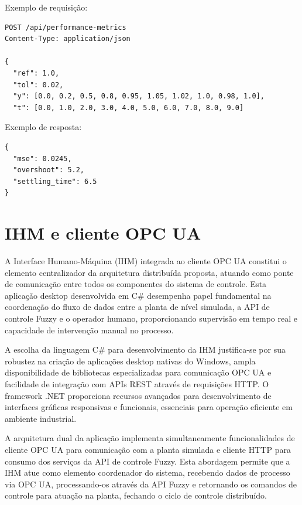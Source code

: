 Exemplo de requisição:

\begin{verbatim}
POST /api/performance-metrics
Content-Type: application/json

{
  "ref": 1.0,
  "tol": 0.02,
  "y": [0.0, 0.2, 0.5, 0.8, 0.95, 1.05, 1.02, 1.0, 0.98, 1.0],
  "t": [0.0, 1.0, 2.0, 3.0, 4.0, 5.0, 6.0, 7.0, 8.0, 9.0]

\end{verbatim}

Exemplo de resposta:

\begin{center}
\begin{verbatim}
{
  "mse": 0.0245,
  "overshoot": 5.2,
  "settling_time": 6.5
}
\end{verbatim}
\end{center}

\section{IHM e cliente OPC UA}
\label{sec:ihmeopc}

A Interface Humano-Máquina (IHM) integrada ao cliente OPC UA constitui o elemento centralizador da arquitetura distribuída proposta, atuando como ponte de comunicação entre todos os componentes do sistema de controle. Esta aplicação desktop desenvolvida em C\# desempenha papel fundamental na coordenação do fluxo de dados entre a planta de nível simulada, a API de controle Fuzzy e o operador humano, proporcionando supervisão em tempo real e capacidade de intervenção manual no processo.

A escolha da linguagem C\# para desenvolvimento da IHM justifica-se por sua robustez na criação de aplicações desktop nativas do Windows, ampla disponibilidade de bibliotecas especializadas para comunicação OPC UA e facilidade de integração com APIs REST através de requisições HTTP. O framework .NET proporciona recursos avançados para desenvolvimento de interfaces gráficas responsivas e funcionais, essenciais para operação eficiente em ambiente industrial.

A arquitetura dual da aplicação implementa simultaneamente funcionalidades de cliente OPC UA para comunicação com a planta simulada e cliente HTTP para consumo dos serviços da API de controle Fuzzy. Esta abordagem permite que a IHM atue como elemento coordenador do sistema, recebendo dados de processo via OPC UA, processando-os através da API Fuzzy e retornando os comandos de controle para atuação na planta, fechando o ciclo de controle distribuído.

